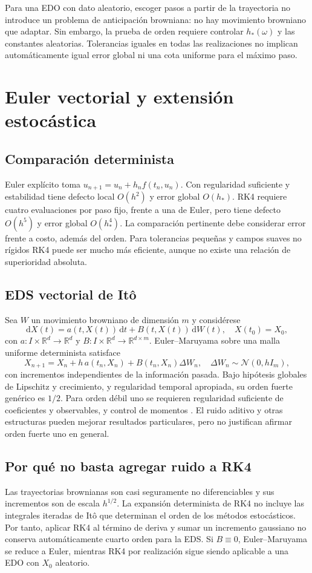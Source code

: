 \documentclass[11pt,a4paper]{article}
\theoremstyle{definition}\newtheorem{definition}[theorem]{Definición}
\theoremstyle{remark}\newtheorem{remark}[theorem]{Observación}
\newcommand{\R}{\mathbb R}\newcommand{\E}{\mathbb E}
\begin{document}
Para una EDO con dato aleatorio, escoger pasos a partir de la trayectoria no
introduce un problema de anticipación browniana: no hay movimiento
browniano que adaptar. Sin embargo, la prueba de orden requiere controlar
$h_*(\omega)$ y las constantes aleatorias. Tolerancias iguales en todas las
realizaciones no implican automáticamente igual error global ni una cota
uniforme para el máximo paso.

\clearpage
\section{Euler vectorial y extensión estocástica}
\subsection{Comparación determinista}
Euler explícito toma $u_{n+1}=u_n+h_nf(t_n,u_n)$. Con regularidad suficiente
y estabilidad tiene defecto local $O(h^2)$ y error global $O(h_*)$.
RK4 requiere cuatro evaluaciones por paso fijo, frente a una de Euler,
pero tiene defecto $O(h^5)$ y error global $O(h_*^4)$.
La comparación pertinente debe considerar error frente a costo, además del
orden. Para tolerancias pequeñas y campos suaves no rígidos RK4 puede ser
mucho más eficiente, aunque no existe una relación de superioridad absoluta.

\subsection{EDS vectorial de Itô}
Sea $W$ un movimiento browniano de dimensión $m$ y considérese
\begin{equation}\label{eq:sde}
 \mathrm dX(t)=a(t,X(t))\,\mathrm dt+B(t,X(t))\,\mathrm dW(t),
 \quad X(t_0)=X_0,
\end{equation}
con $a:I\times\R^d\to\R^d$ y $B:I\times\R^d\to\R^{d\times m}$.
Euler--Maruyama sobre una malla uniforme determinista satisface
\[
 X_{n+1}=X_n+h\,a(t_n,X_n)+B(t_n,X_n)\Delta W_n,
 \quad \Delta W_n\sim\mathcal N(0,hI_m),
\]
con incrementos independientes de la información pasada. Bajo hipótesis
globales de Lipschitz y crecimiento, y regularidad temporal apropiada,
su orden fuerte genérico es $1/2$. Para orden débil uno se requieren
regularidad suficiente de coeficientes y observables, y control de momentos
\cite{higham}. El ruido aditivo y otras estructuras pueden mejorar resultados
particulares, pero no justifican afirmar orden fuerte uno en general.

\subsection{Por qué no basta agregar ruido a RK4}
Las trayectorias brownianas son casi seguramente no diferenciables y sus
incrementos son de escala $h^{1/2}$. La expansión determinista de RK4 no
incluye las integrales iteradas de Itô que determinan el orden de los
métodos estocásticos. Por tanto, aplicar RK4 al término de deriva y sumar
un incremento gaussiano no conserva automáticamente cuarto orden para la
EDS. Si $B\equiv0$, Euler--Maruyama se reduce a Euler, mientras RK4 por
realización sigue siendo aplicable a una EDO con $X_0$ aleatorio.
\end{document}
